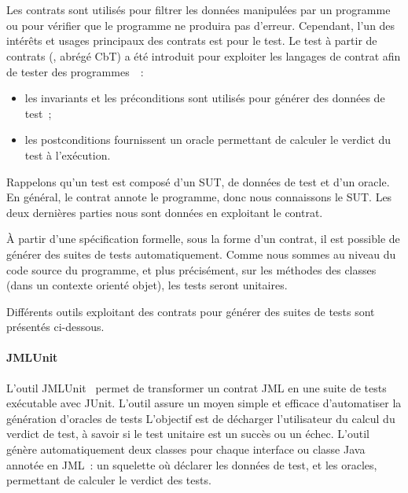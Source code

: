 \section{}
\label{section:sota:cbt}

Les contrats sont utilisés pour {\strong filtrer} les données manipulées par un
programme ou pour vérifier que le programme ne produira pas d'erreur. Cependant,
l'un des intérêts et usages principaux des contrats est pour le {\strong test}.
Le {\strong test à partir de contrats} (,
abrégé CbT) a été introduit pour exploiter les langages de contrat afin de
tester des programmes~~:
%
\begin{itemize}

\item les invariants et les préconditions sont utilisés pour {\strong générer
des données} de test~;

\item les postconditions {\strong fournissent un oracle} permettant de calculer
le verdict du test à l'exécution.

\end{itemize}
%
Rappelons qu'un test est composé d'un SUT, de données de test et d'un oracle. En
général, le contrat annote le programme, donc nous connaissons le SUT. Les deux
dernières parties nous sont données en exploitant le contrat.

À partir d'une spécification formelle, sous la forme d'un contrat, il est
possible de générer des suites de tests automatiquement. Comme nous sommes au
niveau du code source du programme, et plus précisément, sur les méthodes des
classes (dans un contexte orienté objet), les tests seront {\strong unitaires}.

Différents outils exploitant des contrats pour générer des suites de tests sont
présentés ci-dessous.

\paragraph{JMLUnit} L'outil JMLUnit~ permet de
transformer un contrat JML en une suite de tests exécutable avec JUnit. L'outil
assure un moyen simple et efficace d'automatiser la génération d'oracles de
tests L'objectif est de décharger l'utilisateur du calcul du verdict de test, à
savoir si le test unitaire est un succès ou un échec. L'outil génère
automatiquement deux classes pour chaque interface ou classe Java annotée en
JML~: un squelette où déclarer les données de test, et les oracles, permettant
de calculer le verdict des tests.


